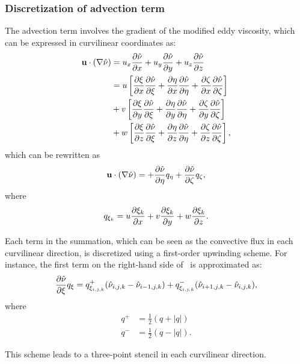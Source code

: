 \subsubsection{Discretization of advection term}
The advection term involves the gradient of the modified eddy viscosity, which can be expressed in curvilinear coordinates as:
\begin{align*}
    \vec{u}\cdot(\nabla\sa) &= 
        u_x\pdiff{\sa}{x} 
        + u_y\pdiff{\sa}{y} 
        + u_z\pdiff{\sa}{z} \\
    &= 
    u\left[ 
        \pdiff{\xi}{x}\pdiff{\sa}{\xi} + \pdiff{\eta}{x}\pdiff{\sa}{\eta} +
            \pdiff{\zeta}{x}\pdiff{\sa}{\zeta}
    \right]
    \\
    &+
    v\left[ 
        \pdiff{\xi}{y}\pdiff{\sa}{\xi} + \pdiff{\eta}{y}\pdiff{\sa}{\eta} +
            \pdiff{\zeta}{y}\pdiff{\sa}{\zeta}
    \right]
    \\
    &+
    w\left[ 
        \pdiff{\xi}{z}\pdiff{\sa}{\xi} + \pdiff{\eta}{z}\pdiff{\sa}{\eta} +
            \pdiff{\zeta}{z}\pdiff{\sa}{\zeta}
    \right],
\end{align*}
which can be rewritten as
\begin{equation}
    \vec{u}\cdot(\nabla\sa) =  + \pdiff{\sa}{\eta}q_\eta + \pdiff{\sa}{\zeta}q_\zeta
    \label{eq:saadvfd},
\end{equation}
where
\begin{equation*}
    q_{\xi_k} = u \frac{\partial \xi_k}{\partial x}  + v \frac{\partial \xi_k}{\partial y}  + w \frac{\partial \xi_k}{\partial z} .
\end{equation*}

Each term in the summation, which can be seen as the convective flux in each curvilinear direction, is discretized using a first-order upwinding scheme. For instance, the first term on the right-hand side of~ is approximated as:
\begin{equation*}
    \pdiff{\sa}{\xi}q_\xi = q_{\xi_{i,j,k}}^+ (\sa_{i,j,k}- \sa_{i-1,j,k})
        + q_{\xi_{i,j,k}}^- ( \sa_{i+1,j,k} - \sa_{i,j,k}),
\end{equation*}
where
\begin{align*}
    q^+ &= \frac{1}{2}(q + |q|) \\
    q^- &= \frac{1}{2}(q - |q|).
\end{align*}

This scheme leads to a three-point stencil in each curvilinear direction.

%
